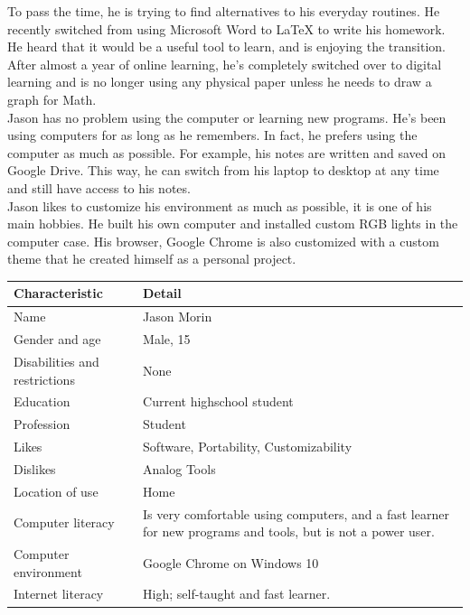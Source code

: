 \documentclass[11pt,onside]{report}
\begin{document}
To pass the time, he is trying to find alternatives to his everyday routines. He recently switched from using Microsoft Word to \LaTeX{} to write his homework. He heard that it would be a useful tool to learn, and is enjoying the transition. After almost a year of online learning, he’s completely switched over to digital learning and is no longer using any physical paper unless he needs to draw a graph for Math.  \\

Jason has no problem using the computer or learning new programs. He’s been using computers for as long as he remembers. In fact, he prefers using the computer as much as possible. For example, his notes are written and saved on Google Drive. This way, he can switch from his laptop to desktop at any time and still have access to his notes. \\

Jason likes to customize his environment as much as possible, it is one of his main hobbies. He built his own computer and installed custom RGB lights in the computer case. His browser, Google Chrome is also customized with a custom theme that he created himself as a personal project.
\begin{center}
    \begin{tabular}{|p{4cm}|p{10cm}|}
        \hline
        \bf{Characteristic} & \bf{Detail} \\
        \hline
        Name & Jason Morin \\
        \hline
        Gender and age & Male, 15 \\
        \hline
        Disabilities and restrictions & None \\
        \hline
        Education & Current highschool student \\
        \hline
        Profession & Student \\
        \hline
        Likes & Software, Portability, Customizability \\
        \hline
        Dislikes & Analog Tools \\
        \hline
        Location of use & Home \\
        \hline
        Computer literacy & Is very comfortable using computers, and a fast learner for new programs and tools, but is not a power user. \\
        \hline
        Computer environment & Google Chrome on Windows 10 \\
        \hline
        Internet literacy &  High; self-taught and fast learner. \\
        \hline
    \end{tabular}
\end{center}
\end{document}
